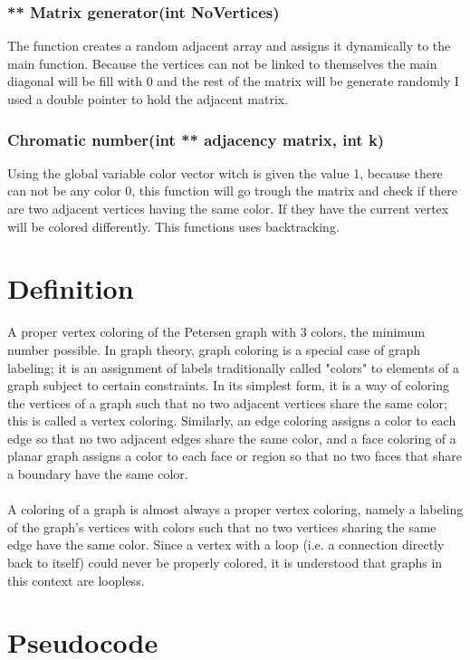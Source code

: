 \documentclass{article}
\begin{document}
\subsubsection{** Matrix generator(int NoVertices)}
The function creates a random adjacent array and assigns it dynamically to the main function. Because the vertices can not be linked to themselves the main diagonal will be fill with 0 and the rest of the matrix will be generate randomly I used a double pointer to hold the adjacent matrix.
\subsubsection{Chromatic number(int ** adjacency matrix, int k)}
Using the global variable color vector witch is given the value 1, because there can not be any color 0, this function will go trough the matrix and check if there are two adjacent vertices having the same color. If they have the current vertex will be colored differently. This functions uses backtracking.


\section{Definition} 
A proper vertex coloring of the Petersen graph with 3 colors, the minimum number possible.
In graph theory, graph coloring is a special case of graph labeling; it is an assignment of labels traditionally called "colors" to elements of a graph subject to certain constraints. In its simplest form, it is a way of coloring the vertices of a graph such that no two adjacent vertices share the same color; this is called a vertex coloring. Similarly, an edge coloring assigns a color to each edge so that no two adjacent edges share the same color, and a face coloring of a planar graph assigns a color to each face or region so that no two faces that share a boundary have the same color.\\
\\A coloring of a graph is almost always a proper vertex coloring, namely a labeling of the graph’s vertices with colors such that no two vertices sharing the same edge have the same color. Since a vertex with a loop (i.e. a connection directly back to itself) could never be properly colored, it is understood that graphs in this context are loopless.


\linebreak

\section{Pseudocode}
\end{document}
